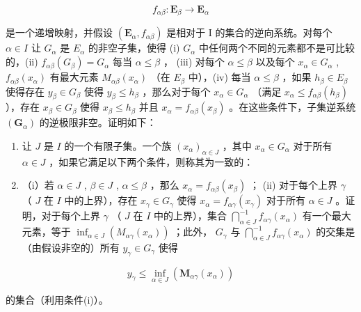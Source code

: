 \[
f _ {\alpha \beta}: \mathbf {E} _ {\beta} \rightarrow \mathbf {E} _ {\alpha}
\]

是一个递增映射，并假设 \((\mathbf{E}_{\alpha}, f_{\alpha\beta})\) 是相对于 I 的集合的逆向系统。对每个 \(\alpha \in I\) 让 \(G_{\alpha}\) 是 \(E_{\alpha}\) 的非空子集，使得 (i) \(G_{\alpha}\) 中任何两个不同的元素都不是可比较的，(ii) \(f_{\alpha\beta}(G_{\beta}) = G_{\alpha}\) 每当 \(\alpha \leqslant \beta\) ， (iii) 对每个 \(\alpha \leqslant \beta\) 以及每个 \(x_{\alpha} \in G_{\alpha}\) , \(f_{\alpha\beta}(x_{\alpha})\) 有最大元素 \(M_{\alpha\beta}(x_{\alpha})\) （在 \(E_{\beta}\) 中），(iv) 每当 \(\alpha \leqslant \beta\) ，如果 \(h_{\beta} \in E_{\beta}\) 使得存在 \(y_{\beta} \in G_{\beta}\) 使得 \(y_{\beta} \leqslant h_{\beta}\) ，那么对于每个 \(x_{\alpha} \in G_{\alpha}\) （满足 \(x_{\alpha} \leqslant f_{\alpha\beta}(h_{\beta})\) ），存在 \(x_{\beta} \in G_{\beta}\) 使得 \(x_{\beta} \leqslant h_{\beta}\) 并且 \(x_{\alpha} = f_{\alpha\beta}(x_{\beta})\) 。在这些条件下，子集逆系统 \((\mathbf{G}_{\alpha})\) 的逆极限非空。证明如下：

\begin{enumerate}
\def\labelenumi{(\alph{enumi})}
\item
  让 \(J\) 是 \(I\) 的一个有限子集。一个族 \((x_{\alpha})_{\alpha \in J}\) ，其中 \(x_{\alpha} \in G_{\alpha}\) 对于所有 \(\alpha \in J\) ，如果它满足以下两个条件，则称其为一致的：
\item
  （i）若 \(\alpha \in J\) , \(\beta \in J\) , \(\alpha \leqslant \beta\) ，那么 \(x_{\alpha} = f_{\alpha \beta}(x_{\beta})\) ； (ii) 对于每个上界 \(\gamma\) （ \(J\) 在 \(I\) 中的上界），存在 \(x_{\gamma} \in G_{\gamma}\) 使得 \(x_{\alpha} = f_{\alpha \gamma}(x_{\gamma})\) 对于所有 \(\alpha \in J\) 。证明，对于每个上界 \(\gamma\) （ \(J\) 在 \(I\) 中的上界），集合 \(\bigcap_{\alpha \in J}^{-1} f_{\alpha \gamma}(x_{\alpha})\) 有一个最大元素，等于 \(\inf_{\alpha \in J} (M_{\alpha \gamma}(x_{\alpha}))\) ；此外， \(G_{\gamma}\) 与 \(\bigcap_{\alpha \in J}^{-1} f_{\alpha \gamma}(x_{\alpha})\) 的交集是（由假设非空的）所有 \(y_{\gamma} \in G_{\gamma}\) 使得
\end{enumerate}

\[
y _ {\gamma} \leqslant \inf _ {\alpha \in J} \left(\mathbf {M} _ {\alpha \gamma} (x _ {\alpha})\right)
\]

的集合（利用条件(i)）。

